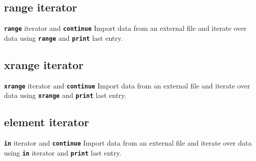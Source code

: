 \documentclass[t]{beamer}
\begin{document}
\subsection{range iterator}
\begin{frame}{\texttt{\textbf{range}} iterator and \texttt{\textbf{continue}}}
\small{Import data from an external file and iterate over data using \texttt{\textbf{range}}  and \texttt{\textbf{print}}  last entry.}
  \begin{figure}[ht]
  \centering
        \lstset{numbers=left}
        
        
   \end{figure}
\end{frame}

\subsection{xrange iterator}
\begin{frame}{\texttt{\textbf{xrange}} iterator and \texttt{\textbf{continue}}}
\small{Import data from an external file and iterate over data using \texttt{\textbf{xrange}}  and \texttt{\textbf{print}}  last entry.}
  \begin{figure}[ht]
  \centering
        \lstset{numbers=left}
        
        
   \end{figure}
\end{frame}

\subsection{element iterator}
\begin{frame}{\texttt{\textbf{in}} iterator and \texttt{\textbf{continue}}}
\small{Import data from an external file and iterate over data using \texttt{\textbf{in}} iterator and \texttt{\textbf{print}}  last entry.}
  \begin{figure}[ht]
  \centering
        \lstset{numbers=left}
        
        
   \end{figure}
\end{frame}
\end{document}
